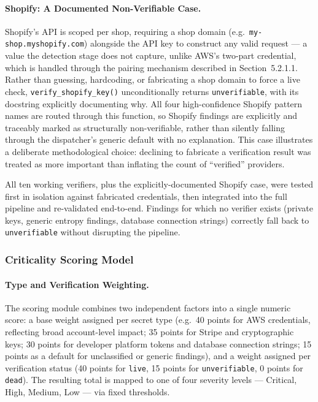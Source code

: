 \documentclass[12pt]{article}
\begin{document}
\paragraph{Shopify: A Documented Non-Verifiable Case.}
Shopify's API is scoped per shop, requiring a shop domain (e.g.\ \texttt{my-shop.myshopify.com}) alongside the API key to construct any valid request --- a value the detection stage does not capture, unlike AWS's two-part credential, which is handled through the pairing mechanism described in Section~5.2.1.1. Rather than guessing, hardcoding, or fabricating a shop domain to force a live check, \texttt{verify\_shopify\_key()} unconditionally returns \texttt{unverifiable}, with its docstring explicitly documenting why. All four high-confidence Shopify pattern names are routed through this function, so Shopify findings are explicitly and traceably marked as structurally non-verifiable, rather than silently falling through the dispatcher's generic default with no explanation. This case illustrates a deliberate methodological choice: declining to fabricate a verification result was treated as more important than inflating the count of ``verified'' providers.

All ten working verifiers, plus the explicitly-documented Shopify case, were tested first in isolation against fabricated credentials, then integrated into the full pipeline and re-validated end-to-end. Findings for which no verifier exists (private keys, generic entropy findings, database connection strings) correctly fall back to \texttt{unverifiable} without disrupting the pipeline.

\subsubsection{Criticality Scoring Model}

\paragraph{Type and Verification Weighting.}
The scoring module combines two independent factors into a single numeric score: a base weight assigned per secret type (e.g.\ 40 points for AWS credentials, reflecting broad account-level impact; 35 points for Stripe and cryptographic keys; 30 points for developer platform tokens and database connection strings; 15 points as a default for unclassified or generic findings), and a weight assigned per verification status (40 points for \texttt{live}, 15 points for \texttt{unverifiable}, 0 points for \texttt{dead}). The resulting total is mapped to one of four severity levels --- Critical, High, Medium, Low --- via fixed thresholds.
\end{document}
